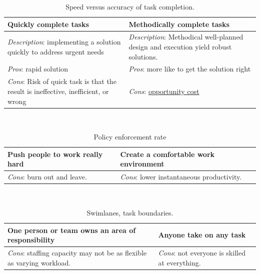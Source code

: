 \begin{center}
\begin{table}[ht]
\begin{tabular}{ | m{\dilemmatablewidth}| m{\dilemmatablewidth} | } 
  \hline
  \textbf{Quickly complete tasks} & 
  \textbf{Methodically complete tasks} \\ 
  \hline
  \textit{Description}: implementing a solution quickly to address urgent needs &
  \textit{Description}: Methodical well-planned design and execution yield robust solutions. \\
  \hline
  \textit{Pros}: rapid solution &
  \textit{Pros}: more like to get the solution right \\
  \hline
  \textit{Cons}: Risk of quick task is that the result is ineffective, inefficient, or wrong &
  \textit{Cons}: \href{https://en.wikipedia.org/wiki/Opportunity_cost}{opportunity cost} \\  
  \hline
\end{tabular}
\caption{Speed versus accuracy of task completion.
}
\label{table:quick-methodical}
\end{table}
\end{center}

\ \\

\begin{center}
\begin{table}[ht]
\begin{tabular}{ | m{\dilemmatablewidth}| m{\dilemmatablewidth} | } 
  \hline
  \textbf{Push people to work really hard} & 
  \textbf{Create a comfortable work environment} \\ 
  \hline
  \textit{Cons}: burn out and leave. & 
  \textit{Cons}: lower instantaneous productivity. \\  
  \hline
\end{tabular}
\caption{Policy enforcement rate
}
\label{table:rate-of-work}
\end{table}
\end{center}

\ \\

\begin{center}
\begin{table}[ht]
\begin{tabular}{ | m{\dilemmatablewidth}| m{\dilemmatablewidth} | } 
  \hline
  \textbf{One person or team owns an area of responsibility} & 
  \textbf{Anyone take on any task} \\ 
  \hline
  \textit{Cons}: staffing capacity may not be as flexible as varying workload. & 
  \textit{Cons}: not everyone is skilled at everything. \\  
  \hline
\end{tabular}
\caption{Swimlanes, task boundaries.
}
\label{table:swimlanes}
\end{table}
\end{center}

